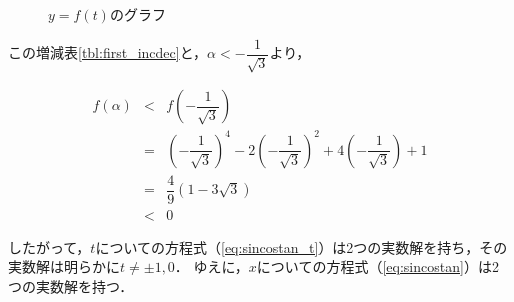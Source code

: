 \documentclass[a4paper,11pt]{jreport}
\begin{document}
\begin{center}
  \begin{figure}[htbp]
    \centering
    \resizebox{100mm}{!}{}
    \caption{$y = f(t)$のグラフ}
  \end{figure}
\end{center}

この増減表\ref{tbl:first_incdec}と，$\alpha < - \dfrac{1}{\sqrt{3}}$より，

\begin{eqnarray}
  f(\alpha)
  & < &
  f \left( - \dfrac{1}{\sqrt{3}} \right)
  \nonumber \\ & = &
  \left( - \dfrac{1}{\sqrt{3}} \right)^4 -2 \left( - \dfrac{1}{\sqrt{3}} \right)^2 + 4 \left( - \dfrac{1}{\sqrt{3}} \right) + 1
  \nonumber \\ & = &
  \dfrac{4}{9} \left( 1 - 3 \sqrt{3} \right)
  \nonumber \\ & < &
  0
\end{eqnarray}

したがって，$t$についての方程式（\ref{eq:sincostan_t}）は2つの実数解を持ち，その実数解は明らかに$t \neq \pm 1, 0$．
ゆえに，$x$についての方程式（\ref{eq:sincostan}）は2つの実数解を持つ．
\end{document}
